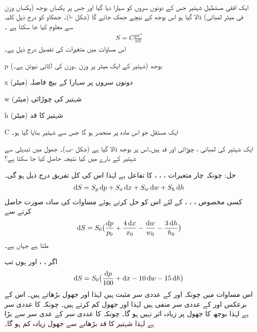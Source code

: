 \\
ایک افقی مستطیل شہتیر جس کے  دونوں سروں کو  سہارا دیا گیا  اور جس پر یکساں بوجھ (یکساں وزن فی میٹر لمبائی) ڈالا گیا ہو  اس  بوجھ کے نیچے جھک جائے گا (شکل -ا)۔ جھکاو   کو درج ذیل کلیہ سے معلوم کیا جا سکتا ہے ۔
\begin{align*}
S=C\frac{px^4}{wh}
\end{align*}
اس مساوات میں متغیرات کی تفصیل درج ذیل ہے۔
\begin{description}
\item{p}\quad
بوجھ (شہتیر کے ایک میٹر پر وزن ۔وزن کی اکائی نیوٹن ہے۔)
\item{x}\quad
دونوں سروں پر سہارا کے بیچ فاصلہ (میٹر)
\item{w}\quad
شہتیر کی چوڑائی (میٹر)
\item{h}\quad
شہتیر کا قد (میٹر)
\item{C}\quad
ایک مستقل  جو اس مادہ پر منحصر ہو گا جس سے شہتیر بنایا گیا ہو۔
\end{description}
ایک شہتیر کی   لمبائی ، چوڑائی    اور   قد    ہیں۔اس پر  بوجھ ڈالا گیا ہے (شکل -ب)۔ جھول میں تبدیلی    سے شہتیر کے بارے میں کیا نتیجہ حاصل کیا جا سکتا ہے؟

حل:\quad
چونکہ  چار متغیرات ، ، ،  کا تفاعل ہے لہٰذا اس  کی  کل تفریق  درج ذیل ہو گی۔
\begin{align*}
\dif S=S_p\dif p+S_x\dif x+S_w\dif w+S_h\dif h
\end{align*}
کسی مخصوص ، ، ،  کے لئے اس کو حل کرتے ہوئے  مساوات کی سادہ صورت حاصل کرنے سے  
\begin{align*}
\dif S=S_0\big(\frac{\dif p}{p_0}+\frac{4\dif x}{x_0}-\frac{\dif w}{w_0}-\frac{3\dif h}{h_0}\big)
\end{align*}
ملتا ہے جہاں  ہے۔

اگر ، ،  اور  ہوں تب
\begin{align}
\dif S=S_0\big(\frac{\dif p}{100}+\dif x-10\dif w-15\dif h\big)
\end{align}
اس مساوات میں چونکہ  اور  کے عددی سر  مثبت ہیں لہٰذا  اور  جھول بڑھاتے ہیں۔ اس کے برعکس  اور  کے عددی سر  منفی ہیں لہٰذا  اور  جھول کم کرتے ہیں۔ چونکہ  کا عددی سر  ہے لہٰذا بوجھ کا جھول پر زیادہ اثر نہیں ہو گا۔ چونکہ  کا عددی سر  کے عدی سر سے بڑا ہے لہٰذا  شہتیر کا قد  بڑھانے سے جھول زیادہ کم ہو گا۔

